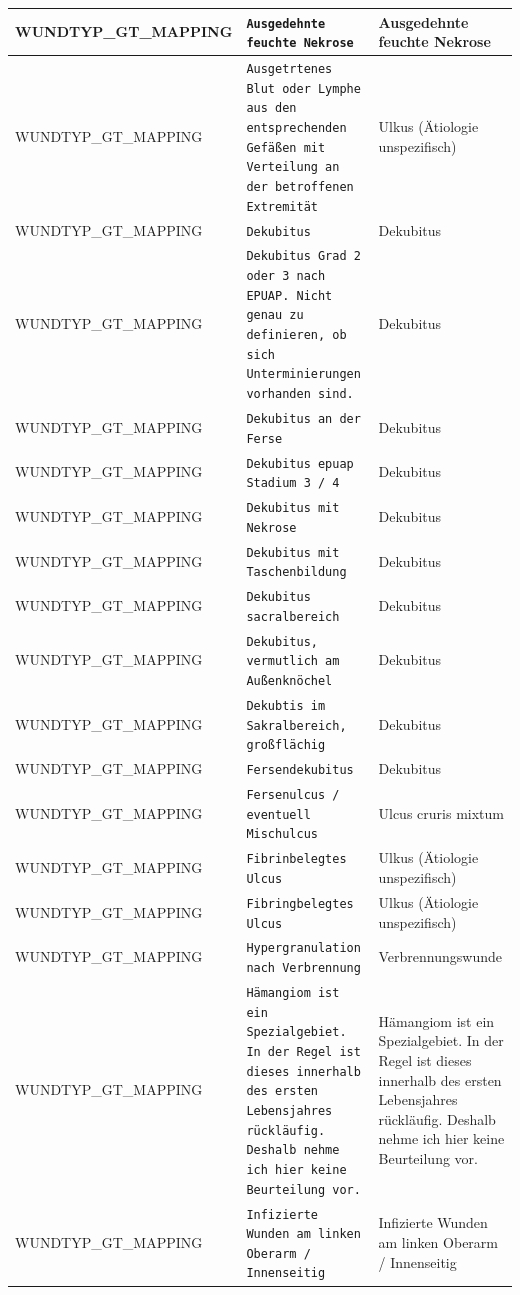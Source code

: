 \begin{longtable}{|p{3.5cm}|p{5cm}|p{6.5cm}|}
WUNDTYP\_GT\_MAPPING & \texttt{Ausgedehnte feuchte Nekrose} & Ausgedehnte feuchte Nekrose \\ \hline
WUNDTYP\_GT\_MAPPING & \texttt{Ausgetrtenes Blut oder Lymphe aus den entsprechenden Gefäßen mit Verteilung an der betroffenen Extremität} & Ulkus (Ätiologie unspezifisch) \\ \hline
WUNDTYP\_GT\_MAPPING & \texttt{Dekubitus} & Dekubitus \\ \hline
WUNDTYP\_GT\_MAPPING & \texttt{Dekubitus Grad 2 oder 3 nach EPUAP.
Nicht genau zu definieren, ob sich Unterminierungen vorhanden sind.} & Dekubitus \\ \hline
WUNDTYP\_GT\_MAPPING & \texttt{Dekubitus an der Ferse} & Dekubitus \\ \hline
WUNDTYP\_GT\_MAPPING & \texttt{Dekubitus epuap Stadium 3 / 4} & Dekubitus \\ \hline
WUNDTYP\_GT\_MAPPING & \texttt{Dekubitus mit Nekrose} & Dekubitus \\ \hline
WUNDTYP\_GT\_MAPPING & \texttt{Dekubitus mit Taschenbildung} & Dekubitus \\ \hline
WUNDTYP\_GT\_MAPPING & \texttt{Dekubitus sacralbereich} & Dekubitus \\ \hline
WUNDTYP\_GT\_MAPPING & \texttt{Dekubitus, vermutlich am Außenknöchel} & Dekubitus \\ \hline
WUNDTYP\_GT\_MAPPING & \texttt{Dekubtis im Sakralbereich, großflächig} & Dekubitus \\ \hline
WUNDTYP\_GT\_MAPPING & \texttt{Fersendekubitus} & Dekubitus \\ \hline
WUNDTYP\_GT\_MAPPING & \texttt{Fersenulcus / eventuell Mischulcus} & Ulcus cruris mixtum \\ \hline
WUNDTYP\_GT\_MAPPING & \texttt{Fibrinbelegtes Ulcus} & Ulkus (Ätiologie unspezifisch) \\ \hline
WUNDTYP\_GT\_MAPPING & \texttt{Fibringbelegtes Ulcus} & Ulkus (Ätiologie unspezifisch) \\ \hline
WUNDTYP\_GT\_MAPPING & \texttt{Hypergranulation nach Verbrennung} & Verbrennungswunde \\ \hline
WUNDTYP\_GT\_MAPPING & \texttt{Hämangiom ist ein Spezialgebiet. In der Regel ist dieses innerhalb des ersten Lebensjahres rückläufig.
Deshalb nehme ich hier keine Beurteilung vor.} & Hämangiom ist ein Spezialgebiet. In der Regel ist dieses innerhalb des ersten Lebensjahres rückläufig.
Deshalb nehme ich hier keine Beurteilung vor. \\ \hline
WUNDTYP\_GT\_MAPPING & \texttt{Infizierte Wunden am linken Oberarm / Innenseitig} & Infizierte Wunden am linken Oberarm / Innenseitig \\ \hline

\end{longtable}
